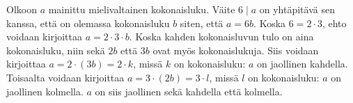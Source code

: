 \begin{Vastaus}{39}
	
\end{Vastaus}
\begin{Vastaus}{40}
\end{Vastaus}
\begin{Vastaus}{41}
\end{Vastaus}
\begin{Vastaus}{42}
\end{Vastaus}
\begin{Vastaus}{43}
	Olkoon $a$ mainittu mielivaltainen kokonaisluku. Väite $6\mid a$ on yhtäpitävä sen kanssa, että on olemassa kokonaisluku $b$ siten, että $a=6b$. Koska $6=2\cdot3$, ehto voidaan kirjoittaa $a=2\cdot3\cdot b$. Koska kahden kokonaisluvun tulo on aina kokonaisluku, niin sekä $2b$ että $3b$ ovat myös kokonaislukuja. Siis voidaan kirjoittaa $a=2\cdot (3b)=2\cdot k$, missä $k$ on kokonaisluku: $a$ on jaollinen kahdella. Toisaalta voidaan kirjoittaa $a=3\cdot (2b)=3\cdot l$, missä $l$ on kokonaisluku: $a$ on jaollinen kolmella. $a$ on siis jaollinen sekä kahdella että kolmella.
	
\end{Vastaus}
\begin{Vastaus}{44}
	
\end{Vastaus}
\begin{Vastaus}{45}
	
\end{Vastaus}
\begin{Vastaus}{46}
	
\end{Vastaus}
\begin{Vastaus}{47}
	
\end{Vastaus}
